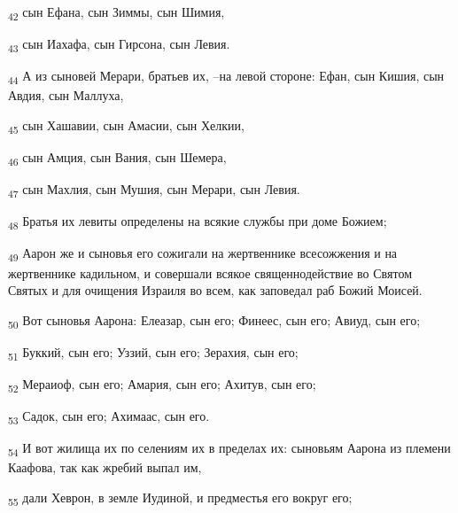 \begin{tcolorbox}
\textsubscript{42} сын Ефана, сын Зиммы, сын Шимия,
\end{tcolorbox}
\begin{tcolorbox}
\textsubscript{43} сын Иахафа, сын Гирсона, сын Левия.
\end{tcolorbox}
\begin{tcolorbox}
\textsubscript{44} А из сыновей Мерари, братьев их, --на левой стороне: Ефан, сын Кишия, сын Авдия, сын Маллуха,
\end{tcolorbox}
\begin{tcolorbox}
\textsubscript{45} сын Хашавии, сын Амасии, сын Хелкии,
\end{tcolorbox}
\begin{tcolorbox}
\textsubscript{46} сын Амция, сын Вания, сын Шемера,
\end{tcolorbox}
\begin{tcolorbox}
\textsubscript{47} сын Махлия, сын Мушия, сын Мерари, сын Левия.
\end{tcolorbox}
\begin{tcolorbox}
\textsubscript{48} Братья их левиты определены на всякие службы при доме Божием;
\end{tcolorbox}
\begin{tcolorbox}
\textsubscript{49} Аарон же и сыновья его сожигали на жертвеннике всесожжения и на жертвеннике кадильном, и совершали всякое священнодействие во Святом Святых и для очищения Израиля во всем, как заповедал раб Божий Моисей.
\end{tcolorbox}
\begin{tcolorbox}
\textsubscript{50} Вот сыновья Аарона: Елеазар, сын его; Финеес, сын его; Авиуд, сын его;
\end{tcolorbox}
\begin{tcolorbox}
\textsubscript{51} Буккий, сын его; Уззий, сын его; Зерахия, сын его;
\end{tcolorbox}
\begin{tcolorbox}
\textsubscript{52} Мераиоф, сын его; Амария, сын его; Ахитув, сын его;
\end{tcolorbox}
\begin{tcolorbox}
\textsubscript{53} Садок, сын его; Ахимаас, сын его.
\end{tcolorbox}
\begin{tcolorbox}
\textsubscript{54} И вот жилища их по селениям их в пределах их: сыновьям Аарона из племени Каафова, так как жребий выпал им,
\end{tcolorbox}
\begin{tcolorbox}
\textsubscript{55} дали Хеврон, в земле Иудиной, и предместья его вокруг его;
\end{tcolorbox}

